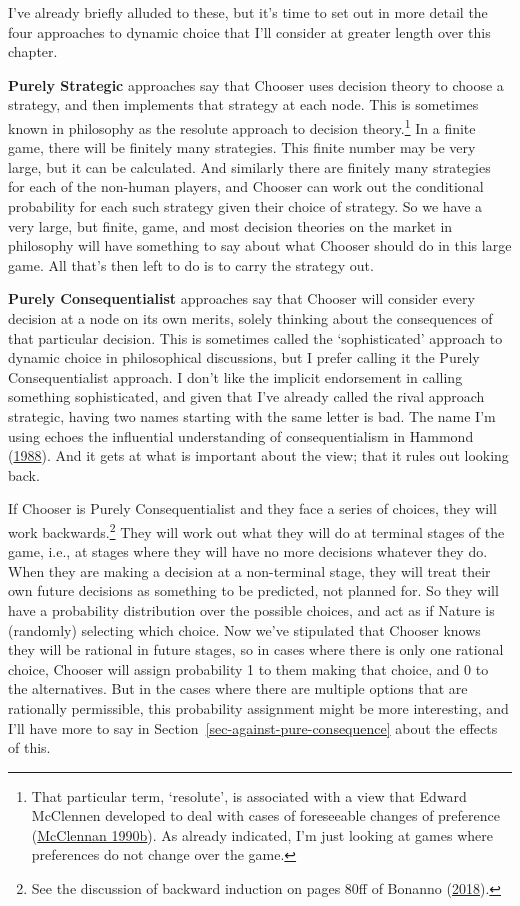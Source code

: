 \documentclass[
  12pt,
  letterpaper,
  DIV=11,
  numbers=noendperiod]{scrreprt}
\begin{document}
I've already briefly alluded to these, but it's time to set out in more
detail the four approaches to dynamic choice that I'll consider at
greater length over this chapter.

\textbf{Purely Strategic} approaches say that Chooser uses decision
theory to choose a strategy, and then implements that strategy at each
node. This is sometimes known in philosophy as the resolute approach to
decision theory.\footnote{That particular term, `resolute', is
  associated with a view that Edward McClennen developed to deal with
  cases of foreseeable changes of preference
  (\protect\hyperlink{ref-McClennen1990}{McClennan 1990b}). As already
  indicated, I'm just looking at games where preferences do not change
  over the game.} In a finite game, there will be finitely many
strategies. This finite number may be very large, but it can be
calculated. And similarly there are finitely many strategies for each of
the non-human players, and Chooser can work out the conditional
probability for each such strategy given their choice of strategy. So we
have a very large, but finite, game, and most decision theories on the
market in philosophy will have something to say about what Chooser
should do in this large game. All that's then left to do is to carry the
strategy out.

\textbf{Purely Consequentialist} approaches say that Chooser will
consider every decision at a node on its own merits, solely thinking
about the consequences of that particular decision. This is sometimes
called the `sophisticated' approach to dynamic choice in philosophical
discussions, but I prefer calling it the Purely Consequentialist
approach. I don't like the implicit endorsement in calling something
sophisticated, and given that I've already called the rival approach
strategic, having two names starting with the same letter is bad. The
name I'm using echoes the influential understanding of consequentialism
in Hammond (\protect\hyperlink{ref-Hammond1988}{1988}). And it gets at
what is important about the view; that it rules out looking back.

If Chooser is Purely Consequentialist and they face a series of choices,
they will work backwards.\footnote{See the discussion of backward
  induction on pages 80ff of Bonanno
  (\protect\hyperlink{ref-Bonanno2018}{2018}).} They will work out what
they will do at terminal stages of the game, i.e., at stages where they
will have no more decisions whatever they do. When they are making a
decision at a non-terminal stage, they will treat their own future
decisions as something to be predicted, not planned for. So they will
have a probability distribution over the possible choices, and act as if
Nature is (randomly) selecting which choice. Now we've stipulated that
Chooser knows they will be rational in future stages, so in cases where
there is only one rational choice, Chooser will assign probability 1 to
them making that choice, and 0 to the alternatives. But in the cases
where there are multiple options that are rationally permissible, this
probability assignment might be more interesting, and I'll have more to
say in Section~\ref{sec-against-pure-consequence} about the effects of
this.
\end{document}
